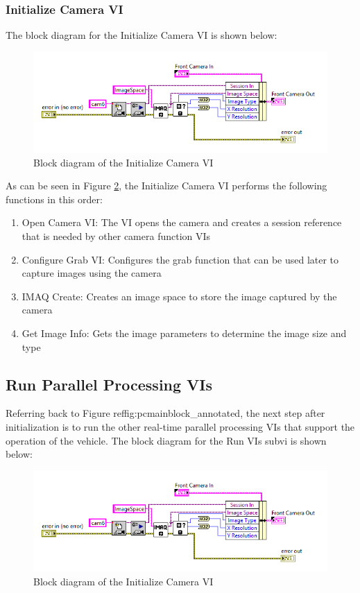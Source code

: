 \newpage

\subsubsection{Initialize Camera VI}

The block diagram for the Initialize Camera VI is shown below:

\begin{figure}[h!]
\centering
\includegraphics[scale=0.75]{Photos/initcamblock.png}
\caption{Block diagram of the Initialize Camera VI}
\label{fig:initcamblock}
\end{figure}

\noindent As can be seen in Figure \ref{fig:initcamblock}, the Initialize Camera VI performs the following functions in this order:

\begin{enumerate}
\item Open Camera VI: The VI opens the camera and creates a session reference that is needed by other camera function VIs
\item Configure Grab VI: Configures the grab function that can be used later to capture images using the camera
\item IMAQ Create: Creates an image space to store the image captured by the camera
\item Get Image Info: Gets the image parameters to determine the image size and type
\end{enumerate}

\subsection{Run Parallel Processing VIs}

Referring back to Figure ref{fig:pcmainblock_annotated}, the next step after initialization is to run the other real-time parallel processing VIs that support the operation of the vehicle. The block diagram for the Run VIs subvi is shown below:

\begin{figure}[h!]
\centering
\includegraphics[scale=0.75]{Photos/initcamblock.png}
\caption{Block diagram of the Initialize Camera VI}
\label{fig:initcamblock}
\end{figure}
